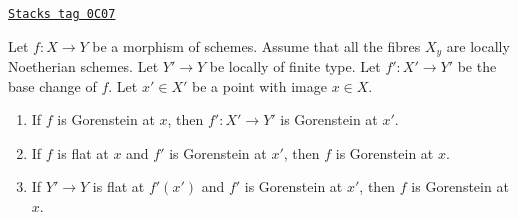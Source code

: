 \begin{lemma}
\label{duality-lemma-base-change-gorenstein}
\href{https://stacks.math.columbia.edu/tag/0C07}{\texttt{Stacks tag 0C07}}

Let $f : X \to Y$ be a morphism of schemes.
Assume that all the fibres $X_y$ are locally Noetherian schemes.
Let $Y' \to Y$ be locally of finite type. Let $f' : X' \to Y'$
be the base change of $f$.
Let $x' \in X'$ be a point with image $x \in X$.
\begin{enumerate}
\item If $f$ is Gorenstein at $x$, then
$f' : X' \to Y'$ is Gorenstein at $x'$.
\item If $f$ is flat at $x$ and $f'$ is Gorenstein at $x'$, then $f$
is Gorenstein at $x$.
\item If $Y' \to Y$ is flat at $f'(x')$ and $f'$ is Gorenstein at
$x'$, then $f$ is Gorenstein at $x$.
\end{enumerate}
\end{lemma}


